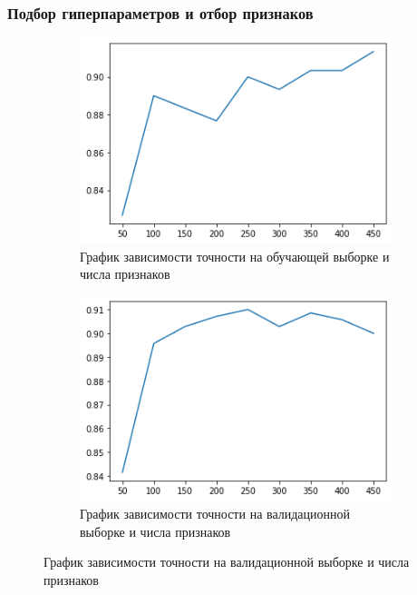 \documentclass{beamer}
\begin{document}
		\begin{frame}
			\frametitle{Подбор гиперпараметров и отбор признаков}
			\begin{figure}[t]
				\centering
				\begin{subfigure}{.45\textwidth}
					\centering
					\includegraphics[scale=0.5, width=\linewidth]{accuraciesNumFeatures.png}
					\caption*{График зависимости точности на обучающей выборке и числа признаков}
				\end{subfigure}
				\begin{subfigure}{.45\textwidth}
					\centering
					\includegraphics[width=\linewidth]{scoresNumFeatures.png}
					\caption*{График зависимости точности на валидационной выборке и числа признаков}
				\end{subfigure}
			\end{figure}
		\end{frame}
	
\end{document}
